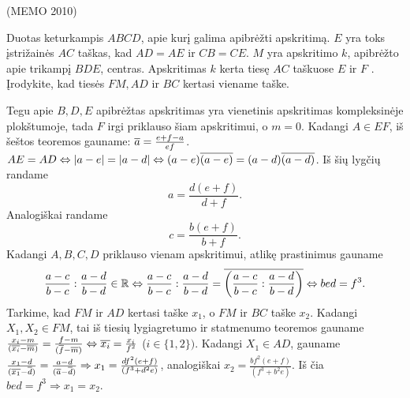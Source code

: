\documentclass[11pt,a4paper,twoside]{book}
\begin{document}
\begin{pavnr} 
(MEMO 2010)

Duotas keturkampis $ABCD$, apie kurį galima apibrėžti apskritimą. $E$ yra toks įstrižainės $AC$
taškas, kad $AD = AE$ ir $CB = CE$. $M$ yra apskritimo $k$, apibrėžto apie trikampį $BDE$,
centras. Apskritimas $k$ kerta tiesę $AC$ taškuose $E$ ir $F$ . Įrodykite, kad tiesės $FM, AD$ ir $BC$ kertasi viename taške.
\end{pavnr}
\begin{sprendimas}
Tegu apie $B, D, E$ apibrėžtas apskritimas yra vienetinis apskritimas kompleksinėje plokštumoje, tada $F$ irgi priklauso šiam apskritimui, o $m=0$. Kadangi $A\in EF$, iš šeštos teoremos gauname: $\overline{a}=\frac{e+f-a}{ef}$. $AE = AD \Leftrightarrow |a-e|=|a-d| \Leftrightarrow (a-e)\overline{(a-e)}=(a-d)\overline{(a-d)}$. Iš šių lygčių randame
$$a=\frac{d(e+f)}{d+f}.$$
Analogiškai randame
$$c=\frac{b(e+f)}{b+f}.$$
Kadangi $A, B, C, D$ priklauso vienam apskritimui, atlikę prastinimus gauname
$$\frac{a-c}{b-c}:\frac{a-d}{b-d}\in \mathbb{R} \Leftrightarrow \frac{a-c}{b-c}:\frac{a-d}{b-d}= \overline{\bigg(\frac{a-c}{b-c}:\frac{a-d}{b-d}\bigg)} \Leftrightarrow bed=f^3.$$
Tarkime, kad $FM$ ir $AD$ kertasi taške $x_1$, o $FM$ ir $BC$ taške $x_2$. Kadangi $X_1, X_2 \in FM$, tai iš tiesių lygiagretumo ir statmenumo teoremos gauname $\frac{x_i-m}{(\overline{x_i}-\overline{m})}=\frac{f-m}{(\overline{f}-\overline{m})} \Leftrightarrow          \overline{x_i}=\frac{x_i}{f^2}$ ($i \in \{1, 2\})$.
Kadangi $X_1 \in AD$, gauname $\frac{x_1-d}{(\overline{x_1}-\overline{d})}=\frac{a-d}{(\overline{a}-\overline{d})} \Rightarrow x_1=\frac{df^2(e+f)}{(f^3+d^2e)}$,
analogiškai $x_2=\frac{bf^2(e+f)}{(f^3+b^2e)}$.
Iš čia $bed=f^3 \Rightarrow x_1=x_2.$
\end{sprendimas}
\end{document}
